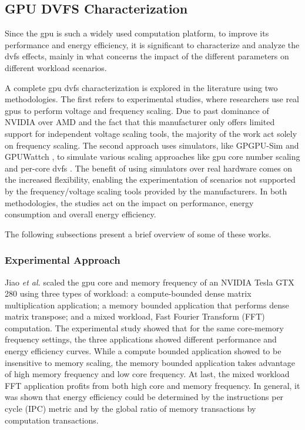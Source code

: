 \subsection{GPU DVFS Characterization}

Since the \acrshort{gpu} is such a widely used computation platform, to improve its performance and energy efficiency, it is significant to characterize and analyze the \acrshort{dvfs} effects, mainly in what concerns the impact of the different parameters on different workload scenarios. 

A complete \acrshort{gpu} \acrshort{dvfs} characterization is explored in the literature using two methodologies. The first refers to experimental studies, where researchers use real \acrshort{gpu}s to perform voltage and frequency scaling. Due to past dominance of NVIDIA over AMD \cite{noauthor_jon_2018, mujtaba_amd_2019} and the fact that this manufacturer only offers limited support for independent voltage scaling tools, the majority of the work act solely on frequency scaling. The second approach uses simulators, like GPGPU-Sim \cite{noauthor_gpgpu-sim/gpgpu-sim_distribution_2019} and GPUWattch \cite{noauthor_gpu_2011, leng_gpuwattch:_2013},  to simulate various scaling approaches like \acrshort{gpu} core number scaling and per-core \acrshort{dvfs} \cite{mei_survey_2016}. The benefit of using simulators over real hardware comes on the increased flexibility, enabling the experimentation of scenarios not supported by the frequency/voltage scaling tools provided by the manufacturers. In both methodologies, the studies act on the impact on performance, energy consumption and overall energy efficiency.

The following subsections present a brief overview of some of these works.


\subsubsection{Experimental Approach}

Jiao \textit{et al.} \cite{jiao_power_2010} scaled the \acrshort{gpu} core and memory frequency of an NVIDIA Tesla GTX 280 using three types of workload: a compute-bounded dense matrix multiplication application; a memory bounded application that performs dense matrix transpose; and a mixed workload, Fast Fourier Transform (FFT) computation. The experimental study showed that for the same core-memory frequency settings, the three applications showed different performance and energy efficiency curves. While a compute bounded application showed to be insensitive to memory scaling, the memory bounded application takes advantage of high memory frequency and low core frequency. At last, the mixed workload FFT application profits from both high core and memory frequency. In general, it was shown that energy efficiency could be determined by the instructions per cycle (IPC) metric and by the global ratio of memory transactions by computation transactions.

